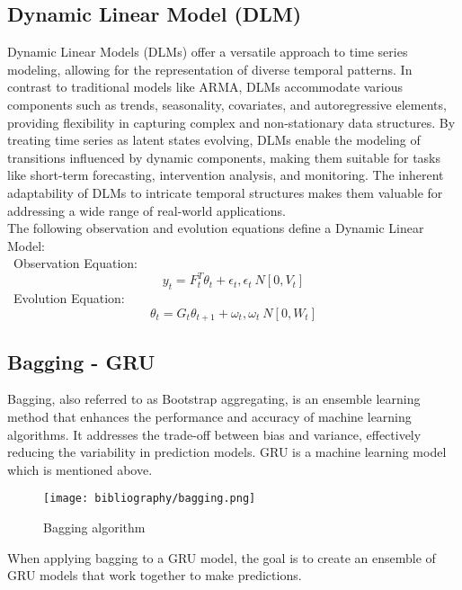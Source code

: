 \documentclass{ieeeojies}
\begin{document}
\subsection{Dynamic Linear Model (DLM)}
Dynamic Linear Models (DLMs) offer a versatile approach to time series modeling, allowing for the representation of diverse temporal patterns. In contrast to traditional models like ARMA, DLMs accommodate various components such as trends, seasonality, covariates, and autoregressive elements, providing flexibility in capturing complex and non-stationary data structures. By treating time series as latent states evolving, DLMs enable the modeling of transitions influenced by dynamic components, making them suitable for tasks like short-term forecasting, intervention analysis, and monitoring. The inherent adaptability of DLMs to intricate temporal structures makes them valuable for addressing a wide range of real-world applications.
\\The following observation and evolution equations define a Dynamic Linear Model:\\
\indent\textbullet\ Observation Equation:
\[y_t=F_t^T \theta_t+\epsilon_t,\epsilon_t~N[0,V_t]\]
\indent\textbullet\ Evolution Equation:
\[\theta_t=G_t \theta_{t+1}+\omega_t,\omega_t~N[0,W_t]\]

\subsection{Bagging - GRU}
Bagging, also referred to as Bootstrap aggregating, is an ensemble learning method that enhances the performance and accuracy of machine learning algorithms. It addresses the trade-off between bias and variance, effectively reducing the variability in prediction models. GRU is a machine learning model which is mentioned above.
\begin{figure}[H]
    \centering
    \texttt{[image: bibliography/bagging.png]}
    \caption{Bagging algorithm}
    \label{fig:bagging}
\end{figure}
When applying bagging to a GRU model, the goal is to create an ensemble of GRU models that work together to make predictions.
\end{document}
